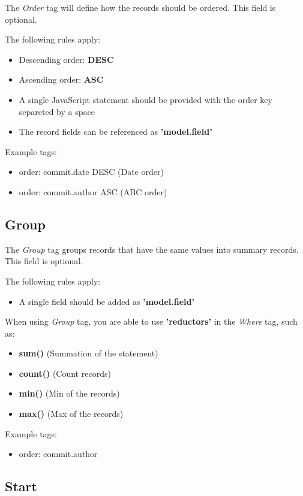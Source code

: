 The \textit{Order} tag will define how the records should be ordered.
This field is optional.

The following rules apply:

\begin{itemize}
	\item Descending order: \textbf{DESC}
	\item Ascending order: \textbf{ASC}
	\item A single JavaScript statement should be provided with the order key separeted by a space
	\item The record fields can be referenced as \textbf{'{model}.{field}'}
\end{itemize}

Example tags:
\begin{itemize}
	\item order: commit.date DESC (Date order)
	\item order: commit.author ASC (ABC order)
\end{itemize}

\subsection{Group}

The \textit{Group} tag groups records that have the same values into summary records.
This field is optional.

The following rules apply:
\begin{itemize}
	\item A single field should be added as \textbf{'{model}.{field}'}
\end{itemize}

When using \textit{Group} tag, you are able to use \textbf{'reductors'} in the \textit{Where} tag, such as:
\begin{itemize}
	\item \textbf{sum()} (Summation of the statement)
	\item \textbf{count()} (Count records)
	\item \textbf{min()} (Min of the records)
	\item \textbf{max()} (Max of the records)
\end{itemize}

Example tags:
\begin{itemize}
	\item order: commit.author
\end{itemize}

\subsection{Start}

